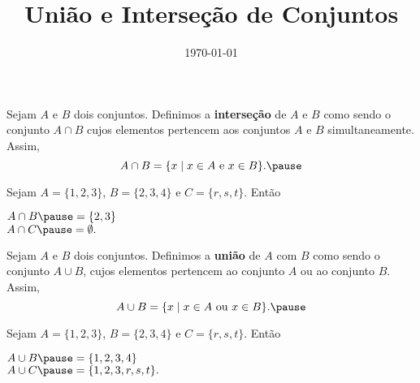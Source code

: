 \documentclass{beamer}
\title{Uni\~ao e Interse\c{c}\~ao de Conjuntos}
\author[\autor]{\autor}
\institute[\instituto]{\instituto}
\date{\today}
\begin{document}
    \begin{frame}
        \maketitle
    \end{frame}


    \begin{frame}
        \begin{definicao}
            Sejam $A$ e $B$ dois conjuntos. Definimos a \textbf{interse{\c c}{\~a}o} de $A$ e $B$ \pause como sendo o conjunto $A \cap B$ \pause cujos elementos pertencem aos conjuntos $A$ e $B$ simultaneamente. \pause Assim,
            \[
                A \cap B = \{x \mid x \in A\mbox{ e }  x \in B\}.\pause
            \]
        \end{definicao}

        \begin{exemplo}
            Sejam $A = \{1, 2, 3\}$, \pause $B = \{2, 3, 4\}$ \pause e $C = \{r, s, t\}$. \pause Ent\~ao\pause
            \begin{center}
                $A \cap B \pause = \{2, 3\}$\pause\\
                $A \cap C \pause = \emptyset.$\pause
            \end{center}
        \end{exemplo}

    \end{frame}

    \begin{frame}
        \begin{definicao}
            Sejam $A$ e $B$ dois conjuntos. \pause Definimos a \textbf{uni{\~a}o} de $A$ com $B$ \pause como sendo o conjunto $A \cup B$, \pause cujos elementos pertencem ao conjunto $A$ ou ao conjunto $B$. \pause Assim,\pause
            \[
                A \cup B = \{x \mid x \in A \mbox{ ou } x \in B\}.\pause
            \]
        \end{definicao}

        \begin{exemplo}
            Sejam $A = \{1, 2, 3\}$, \pause $B = \{2, 3, 4\}$ \pause e $C = \{r, s, t\}$. \pause Ent\~ao\pause
            \begin{center}
                $A \cup B \pause = \{1,2,3,4\}$\pause\\
                $A \cup C \pause = \{1,2,3,r,s,t\}.$\pause
            \end{center}
        \end{exemplo}
    \end{frame}
\end{document}
